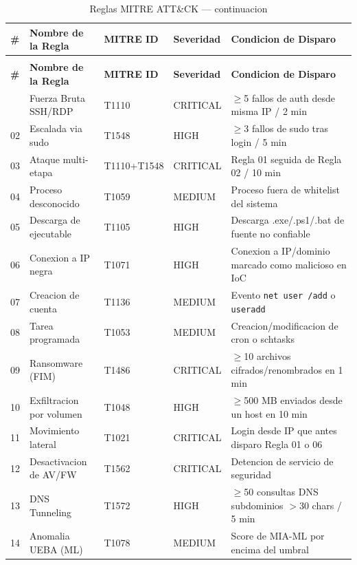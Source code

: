 \documentclass[12pt, a4paper]{report}
\begin{document}
\begin{longtable}{@{}p{0.6cm}p{4cm}p{2.2cm}p{2cm}p{4cm}@{}}
\caption{Reglas de correlacion MITRE ATT\&CK implementadas en MCOR} \\
\toprule
\textbf{\#} & \textbf{Nombre de la Regla} & \textbf{MITRE ID} & \textbf{Severidad} & \textbf{Condicion de Disparo} \\
\midrule
\endfirsthead
\caption[]{Reglas MITRE ATT\&CK --- continuacion} \\
\toprule
\textbf{\#} & \textbf{Nombre de la Regla} & \textbf{MITRE ID} & \textbf{Severidad} & \textbf{Condicion de Disparo} \\
\midrule
\endhead
\bottomrule
\endfoot
01 & Fuerza Bruta SSH/RDP     & T1110      & CRITICAL & $\geq$5 fallos de auth desde misma IP / 2 min \\
02 & Escalada via sudo        & T1548      & HIGH     & $\geq$3 fallos de sudo tras login / 5 min \\
03 & Ataque multi-etapa       & T1110+T1548 & CRITICAL & Regla 01 seguida de Regla 02 / 10 min \\
04 & Proceso desconocido      & T1059      & MEDIUM   & Proceso fuera de whitelist del sistema \\
05 & Descarga de ejecutable   & T1105      & HIGH     & Descarga .exe/.ps1/.bat de fuente no confiable \\
06 & Conexion a IP negra      & T1071      & HIGH     & Conexion a IP/dominio marcado como malicioso en IoC \\
07 & Creacion de cuenta       & T1136      & MEDIUM   & Evento \texttt{net user /add} o \texttt{useradd} \\
08 & Tarea programada         & T1053      & MEDIUM   & Creacion/modificacion de cron o schtasks \\
09 & Ransomware (FIM)         & T1486      & CRITICAL & $\geq$10 archivos cifrados/renombrados en 1 min \\
10 & Exfiltracion por volumen & T1048      & HIGH     & $\geq$500 MB enviados desde un host en 10 min \\
11 & Movimiento lateral       & T1021      & CRITICAL & Login desde IP que antes disparo Regla 01 o 06 \\
12 & Desactivacion de AV/FW   & T1562      & CRITICAL & Detencion de servicio de seguridad \\
13 & DNS Tunneling            & T1572      & HIGH     & $\geq$50 consultas DNS subdominios $>$30 chars / 5 min \\
14 & Anomalia UEBA (ML)       & T1078      & MEDIUM   & Score de MIA-ML por encima del umbral \\
\end{longtable}
\end{document}
